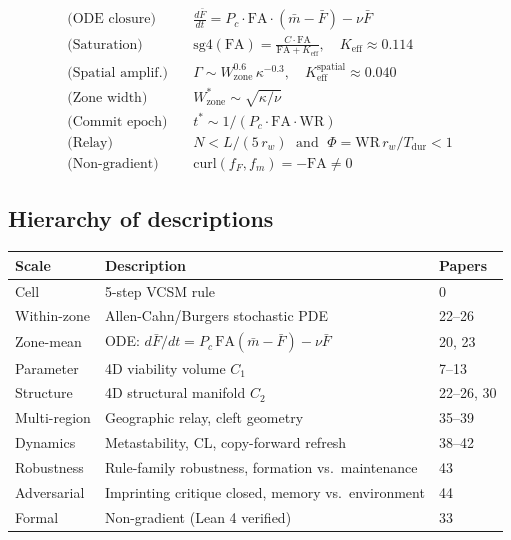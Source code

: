 \documentclass[11pt]{article}
\begin{document}
\begin{align}
\text{(ODE closure)} \quad &\frac{d\bar{F}}{dt} = P_c \cdot \mathrm{FA} \cdot (\bar{m}-\bar{F}) - \nu\bar{F} \\[4pt]
\text{(Saturation)} \quad  &\mathrm{sg4}(\mathrm{FA}) = \frac{C \cdot \mathrm{FA}}{\mathrm{FA} + K_\mathrm{eff}}, \quad K_\mathrm{eff} \approx 0.114 \\[4pt]
\text{(Spatial amplif.)} \quad &\Gamma \sim W_\mathrm{zone}^{0.6}\,\kappa^{-0.3}, \quad K_\mathrm{eff}^\mathrm{spatial} \approx 0.040 \\[4pt]
\text{(Zone width)} \quad  &W_\mathrm{zone}^* \sim \sqrt{\kappa/\nu} \\[4pt]
\text{(Commit epoch)} \quad &t^* \sim 1/(P_c \cdot \mathrm{FA} \cdot \mathrm{WR}) \\[4pt]
\text{(Relay)} \quad        &N < L/(5\,r_w) \;\text{ and }\; \Phi = \mathrm{WR}\,r_w/T_\mathrm{dur} < 1 \\[4pt]
\text{(Non-gradient)} \quad &\mathrm{curl}(f_F, f_m) = -\mathrm{FA} \neq 0
\end{align}

\subsection{Hierarchy of descriptions}

\begin{center}
\begin{tabular}{lll}
\toprule
Scale & Description & Papers \\
\midrule
Cell          & 5-step VCSM rule                    & 0 \\
Within-zone   & Allen-Cahn/Burgers stochastic PDE   & 22--26 \\
Zone-mean     & ODE: $d\bar{F}/dt = P_c\,\mathrm{FA}(\bar{m}-\bar{F}) - \nu\bar{F}$ & 20, 23 \\
Parameter     & 4D viability volume $C_1$            & 7--13 \\
Structure     & 4D structural manifold $C_2$         & 22--26, 30 \\
Multi-region  & Geographic relay, cleft geometry    & 35--39 \\
Dynamics      & Metastability, CL, copy-forward refresh & 38--42 \\
Robustness    & Rule-family robustness, formation vs.\ maintenance & 43 \\
Adversarial   & Imprinting critique closed, memory vs.\ environment  & 44 \\
Formal        & Non-gradient (Lean 4 verified)      & 33 \\
\bottomrule
\end{tabular}
\end{center}
\end{document}

